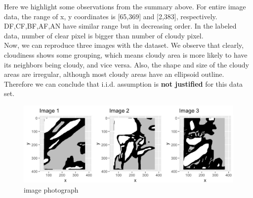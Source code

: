 \documentclass[jou]{apa}%
\begin{document}
Here we highlight some observations from the summary above. For entire image data, the range of x, y coordinates is [65,369] and [2,383], respectively. DF,CF,BF,AF,AN have similar range but in decreasing order. In the labeled data, number of clear pixel is bigger than number of cloudy pixel.\\
Now, we can reproduce three images with the dataset. We observe that clearly, cloudiness shows some grouping, which means cloudy area is more likely to have its neighbors being cloudy, and vice versa. Also, the shape and size of the cloudy areas are irregular, although most cloudy areas have an ellipsoid outline. Therefore we can conclude that i.i.d. assumption is \textbf{not justified} for this data set.
\begin{figure}[H]\hspace*{-1cm} \centering\includegraphics[scale=0.15,]{graphs-1}\caption{image photograph}\end{figure} 
\end{document}
